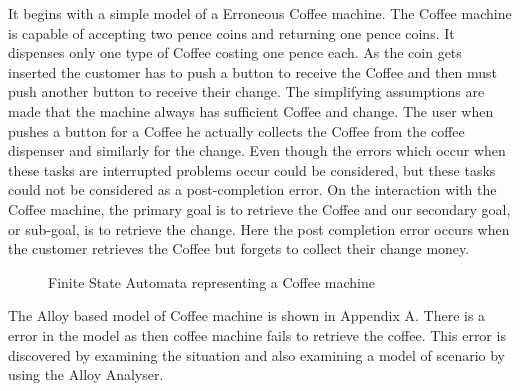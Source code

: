 \documentclass[a4paper,10pt]{report}
\begin{document}
It begins with a simple model of a Erroneous Coffee machine. The Coffee machine is capable of accepting two pence coins and returning one pence coins. It dispenses only one type of Coffee costing one pence each. As the coin gets inserted the customer has to push a button to receive the Coffee and then must push another button to receive their change. The simplifying assumptions are made that the machine always has sufficient Coffee and change. The user when pushes a button for a Coffee he actually collects the Coffee from the coffee dispenser and similarly for the change. Even though the errors which occur when these tasks are interrupted problems occur could be considered, but these tasks could not be considered as a post-completion error. On the interaction with the Coffee machine, the primary goal is to retrieve the Coffee and our secondary goal, or sub-goal, is to retrieve the change. Here the post completion error occurs when the customer retrieves the Coffee but forgets to collect their change money. 
\begin{figure}[h!]
\centering
{}
 \caption{Finite State Automata representing a Coffee machine}
\end{figure}


The Alloy based model of Coffee machine is shown in Appendix A. There is a error in the model as then coffee machine fails to retrieve the coffee. This error is discovered by examining the situation and also examining a model of scenario by using the Alloy Analyser. 
\end{document}
